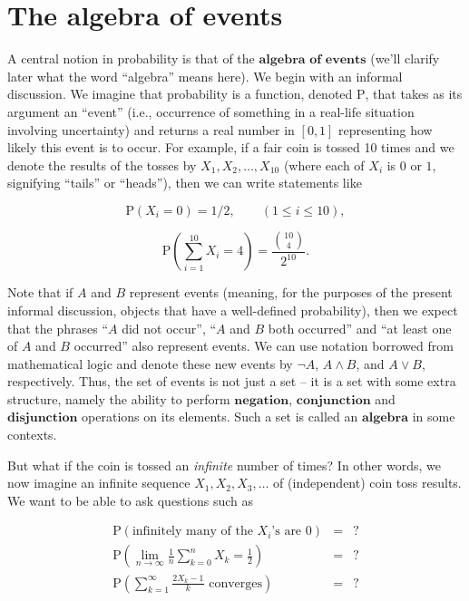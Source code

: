 \section{The algebra of events}

A central notion in probability is that of the
$\textbf{algebra of events}$ (we'll clarify later
what the word ``algebra'' means here). We begin with
an informal discussion. We imagine that probability is
a function, denoted $\mathrm{P}$, that takes as its
argument an ``event'' (i.e., occurrence of something
in a real-life situation involving uncertainty) and
returns a real number in $[0,1]$ representing how
likely this event is to occur. For example, if a fair
coin is tossed 10 times and we denote the results of
the tosses by $X_1,X_2,\ldots,X_{10}$ (where each of
$X_i$ is $0$ or $1$, signifying ``tails'' or
``heads''), then we can write statements like

\[
\mathrm{P}(X_i = 0) = 1/2, \qquad (1\le i\le 10),
\]

\[
\mathrm{P}\left(\sum_{i=1}^{10} X_i = 4\right) = \frac{\binom{10}{4}}{2^{10}}.
\]

\noindent Note that if $A$ and $B$ represent events (meaning,
for the purposes of the present informal discussion,
objects that have a well-defined probability), then we
expect that the phrases ``$A$ did not occur'', ``$A$
and $B$ both occurred'' and ``at least one of $A$ and
$B$ occurred'' also represent events. We can use
notation borrowed from mathematical logic and denote
these new events by $\lnot A$, $A\wedge B$, and
$A \vee B$, respectively. Thus, the set of events is
not just a set -- it is a set with some extra
structure, namely the ability to perform
$\textbf{negation}$, $\textbf{conjunction}$ and
$\textbf{disjunction}$ operations on its elements.
Such a set is called an $\textbf{algebra}$ in some
contexts.

But what if the coin is tossed an \emph{infinite} number
of times? In other words, we now imagine an infinite
sequence $X_1,X_2,X_3,\ldots$ of (independent) coin
toss results. We want to be able to ask questions such
as

\begin{eqnarray*}
\mathrm{P}(\textrm{infinitely many of the $X_i$'s are 0}) &=& ? \\
\mathrm{P}\left(\lim_{n\to\infty} \frac{1}{n} \sum_{k=0}^n X_k = \frac12\right) &=& ? \\
\mathrm{P}\left(\sum_{k=1}^\infty \frac{2X_k-1}{k}\textrm{ converges}\right) &=& ?
\end{eqnarray*}

